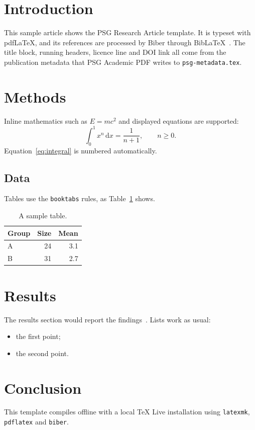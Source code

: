 \section{Introduction}
This sample article shows the PSG Research Article template. It is typeset with pdf\LaTeX{},
and its references are processed by Biber through Bib\LaTeX{}~\cite{psg-sample-handbook,psg-sample-article}.
The title block, running headers, licence line and DOI link all come from the publication
metadata that PSG Academic PDF writes to \texttt{psg-metadata.tex}.

\section{Methods}
Inline mathematics such as $E = mc^2$ and displayed equations are supported:
\begin{equation}
  \int_0^1 x^n \, \mathrm{d}x = \frac{1}{n+1}, \qquad n \geq 0.
  \label{eq:integral}
\end{equation}
Equation~\eqref{eq:integral} is numbered automatically.

\subsection{Data}
Tables use the \texttt{booktabs} rules, as Table~\ref{tab:sample} shows.
\begin{table}[ht]
  \centering
  \caption{A sample table.}
  \label{tab:sample}
  \begin{tabular}{lrr}
    \toprule
    Group & Size & Mean \\
    \midrule
    A & 24 & 3.1 \\
    B & 31 & 2.7 \\
    \bottomrule
  \end{tabular}
\end{table}

\section{Results}
The results section would report the findings~\cite{psg-sample-article}. Lists work as usual:
\begin{itemize}
  \item the first point;
  \item the second point.
\end{itemize}

\section{Conclusion}
This template compiles offline with a local \TeX{} Live installation using \texttt{latexmk},
\texttt{pdflatex} and \texttt{biber}.
